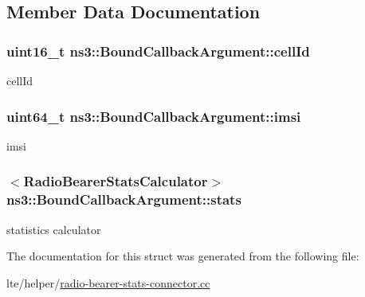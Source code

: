 \subsection{Member Data Documentation}
\subsubsection[{\texorpdfstring{cell\+Id}{cellId}}]{\setlength{\rightskip}{0pt plus 5cm}uint16\+\_\+t ns3\+::\+Bound\+Callback\+Argument\+::cell\+Id}\hypertarget{structns3_1_1BoundCallbackArgument_a178da727e2c7b1222b361395d573e61d}{}\label{structns3_1_1BoundCallbackArgument_a178da727e2c7b1222b361395d573e61d}


cell\+Id 

\subsubsection[{\texorpdfstring{imsi}{imsi}}]{\setlength{\rightskip}{0pt plus 5cm}uint64\+\_\+t ns3\+::\+Bound\+Callback\+Argument\+::imsi}\hypertarget{structns3_1_1BoundCallbackArgument_a3fff4d2bee5073074e52e6f819ba80e0}{}\label{structns3_1_1BoundCallbackArgument_a3fff4d2bee5073074e52e6f819ba80e0}


imsi 

\subsubsection[{\texorpdfstring{stats}{stats}}]{$<${\bf Radio\+Bearer\+Stats\+Calculator}$>$ ns3\+::\+Bound\+Callback\+Argument\+::stats}\hypertarget{structns3_1_1BoundCallbackArgument_a1647af8739b3d6cd51867020fdcefa6e}{}\label{structns3_1_1BoundCallbackArgument_a1647af8739b3d6cd51867020fdcefa6e}


statistics calculator 



The documentation for this struct was generated from the following file\+:\begin{DoxyCompactItemize}
\item 
lte/helper/\hyperlink{radio-bearer-stats-connector_8cc}{radio-\/bearer-\/stats-\/connector.\+cc}\end{DoxyCompactItemize}
